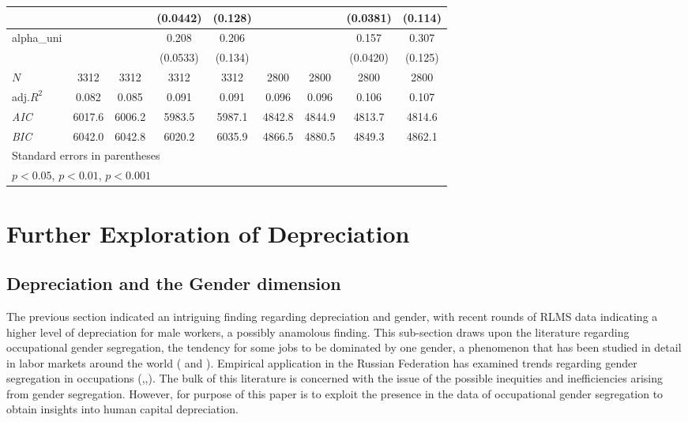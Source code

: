 \documentclass[12pt,a4paper]{article}
\numberwithin{equation}{section}
\begin{document}
\begin{table}[H]
\begin{tabular}{l*{8}{c}}
		&&&(0.0442)&(0.128)&&&(0.0381)&(0.114)\\
		\hline
		alpha\_uni&&&0.208\sym{***}&0.206&&&0.157\sym{***}&0.307\sym{*}\\
		&&&(0.0533)&(0.134)&&&(0.0420)&(0.125)\\
		\hline
		\(N\)&3312&3312&3312&3312&2800&2800&2800&2800\\
		adj.\(R^{2}\)&0.082&0.085&0.091&0.091&0.096&0.096&0.106&0.107\\
		\textit{AIC}&6017.6&6006.2&5983.5&5987.1&4842.8&4844.9&4813.7&4814.6\\
		\textit{BIC}&6042.0&6042.8&6020.2&6035.9&4866.5&4880.5&4849.3&4862.1\\
		\bottomrule
		\multicolumn{9}{l}{\footnotesize Standard errors in parentheses}\\
		\multicolumn{9}{l}{\footnotesize \sym{*} \(p<0.05\), \sym{**} \(p<0.01\), \sym{***} \(p<0.001\)}\\
	\end{tabular}
\end{table}


\section{Further Exploration of Depreciation}
\subsection{Depreciation and the Gender dimension}

The previous section indicated an intriguing finding regarding depreciation and gender, with recent rounds of RLMS data indicating a higher level of depreciation for male workers, a possibly anamolous finding. This sub-section draws upon the literature regarding occupational gender segregation, the tendency for some jobs to be dominated by one gender, a phenomenon that has been studied in detail in labor markets around the world (\citet{preston_179_1999} and \citet{blau_178_2013}). Empirical application in the Russian Federation has examined trends regarding gender segregation in occupations (\citet{klimova_159._2009},\citet{klimova_131._2012},\citet{kosyakova_121._2015}). The bulk of this literature is concerned with the issue of the possible inequities and inefficiencies arising from gender segregation. However, for purpose of this paper is to exploit the presence in the data of occupational gender segregation to obtain insights into human capital depreciation.
\end{document}
